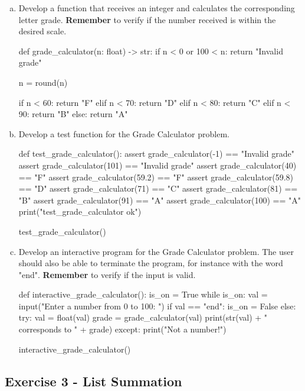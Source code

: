 \documentclass[12pt]{article}
\begin{document}
\begin{enumerate}[a)]
  \item Develop a function that receives an integer and calculates the 
    corresponding letter grade. \textbf{Remember} to verify if the number 
    received is within the desired scale.
  \begin{pythonlst}
def grade_calculator(n: float) -> str:
  if n < 0 or 100 < n:
    return "Invalid grade"

  n = round(n)

  if n < 60:
    return "F"
  elif n < 70:
    return "D"
  elif n < 80:
    return "C"
  elif n < 90:
    return "B"
  else:
    return "A"
  \end{pythonlst}
  \vspace{-6mm}
  \item Develop a test function for the Grade Calculator problem.
  \begin{pythonlst}
def test_grade_calculator():
  assert grade_calculator(-1) == "Invalid grade"
  assert grade_calculator(101) == "Invalid grade"
  assert grade_calculator(40) == "F"
  assert grade_calculator(59.2) == "F"
  assert grade_calculator(59.8) == "D"
  assert grade_calculator(71) == "C"
  assert grade_calculator(81) == "B"
  assert grade_calculator(91) == "A"
  assert grade_calculator(100) == "A"
  print("test_grade_calculator ok")

test_grade_calculator()
  \end{pythonlst}
  \vspace{-6mm}
  \item Develop an interactive program for the Grade Calculator problem. The 
    user should also be able to terminate the program, for instance with the 
    word "end". \textbf{Remember} to verify if the input is valid. \\
  \begin{pythonlst}
def interactive_grade_calculator():
  is_on = True
  while is_on:
    val = input("Enter a number from 0 to 100: ")
    if val == "end":
      is_on = False
    else:
      try:
        val = float(val)
        grade = grade_calculator(val)
        print(str(val) + " corresponds to " + grade)
      except:
        print("Not a number!")

interactive_grade_calculator()
  \end{pythonlst}
  \vspace{-6mm}
\end{enumerate}

\subsection*{Exercise 3 - List Summation}
\end{document}
